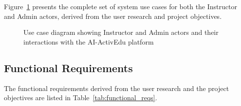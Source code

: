 Figure~\ref{fig:usecase} presents the complete set of system use cases for
both the Instructor and Admin actors, derived from the user research and
project objectives.

\begin{figure}[H]
  \centering
  \resizebox{\linewidth}{!}{}
  \caption{Use case diagram showing Instructor and Admin actors and their
           interactions with the AI-ActivEdu platform}
  \label{fig:usecase}
\end{figure}

\subsection{Functional Requirements}

The functional requirements derived from the user research and the project
objectives are listed in Table~\ref{tab:functional_reqs}.

